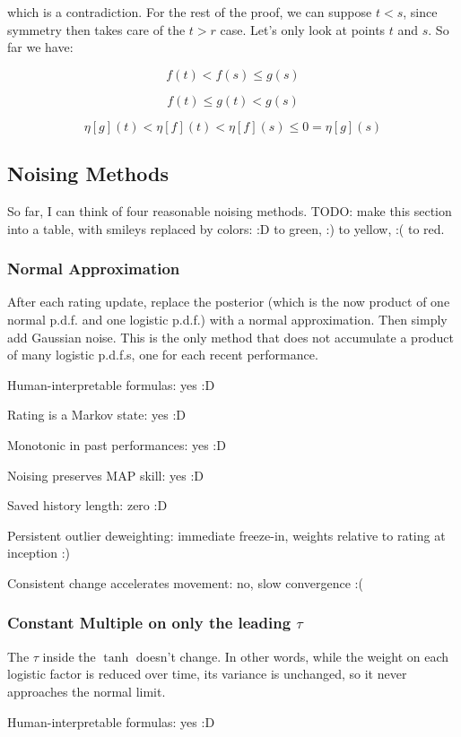 which is a contradiction. For the rest of the proof, we can suppose $t < s$, since symmetry then takes care of the $t > r$ case. Let's only look at points $t$ and $s$. So far we have:

\[ f(t) < f(s) \le g(s) \]

\[ f(t) \le g(t) < g(s) \]

\[ \eta[g](t) < \eta[f](t) < \eta[f](s) \le 0 = \eta[g](s) \]

\subsection{Noising Methods}

So far, I can think of four reasonable noising methods. TODO: make this section into a table, with smileys replaced by colors: :D to green, :) to yellow, :( to red.

\subsubsection{Normal Approximation}

After each rating update, replace the posterior (which is the now product of one normal p.d.f. and one logistic p.d.f.) with a normal approximation. Then simply add Gaussian noise. This is the only method that does not accumulate a product of many logistic p.d.f.s, one for each recent performance.

Human-interpretable formulas: yes :D

Rating is a Markov state: yes :D

Monotonic in past performances: yes :D

Noising preserves MAP skill: yes :D

Saved history length: zero :D

Persistent outlier deweighting: immediate freeze-in, weights relative to rating at inception :)

Consistent change accelerates movement: no, slow convergence :(

\subsubsection{Constant Multiple on only the leading $\tau$}

The $\tau$ inside the $\tanh$ doesn't change. In other words, while the weight on each logistic factor is reduced over time, its variance is unchanged, so it never approaches the normal limit.

Human-interpretable formulas: yes :D


